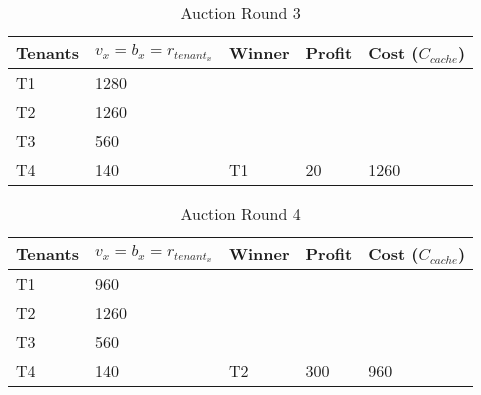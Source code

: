 \documentclass[conference]{IEEEtran}
\begin{document}
\begin{table}[htbp]
	\caption{Auction Round 3}
	\begin{tabular}{|l|l|l|l|l|}
		\hline
		\rowcolor[HTML]{C0C0C0} 
		Tenants& $v_x = b_x = r_{tenant_x}$ & Winner               & Profit                & Cost ($C_{cache}$)             \\ \hline
		T1          & 1280                             &                      &                       &                        \\ \cline{1-2}
		T2          & 1260                             &                      &                       &                        \\ \cline{1-2}
		T3          & 560                              &                      &                       &                        \\ \cline{1-2}
		T4          & 140                              & \multirow{-4}{*}{T1} & \multirow{-4}{*}{20} & \multirow{-4}{*}{1260} \\ \hline
	\end{tabular}
\end{table}

\begin{table}[htbp]
	\caption{Auction Round 4}
	\begin{tabular}{|l|l|l|l|l|}
		\hline
		\rowcolor[HTML]{C0C0C0} 
		Tenants& $v_x = b_x = r_{tenant_x}$ & Winner               & Profit                & Cost ($C_{cache}$)             \\ \hline
		T1          & 960                              &                      &                       &                        \\ \cline{1-2}
		T2          & 1260                             &                      &                       &                        \\ \cline{1-2}
		T3          & 560                              &                      &                       &                        \\ \cline{1-2}
		T4          & 140                              & \multirow{-4}{*}{T2} & \multirow{-4}{*}{300} & \multirow{-4}{*}{960} \\ \hline
	\end{tabular}
\end{table}
\end{document}
